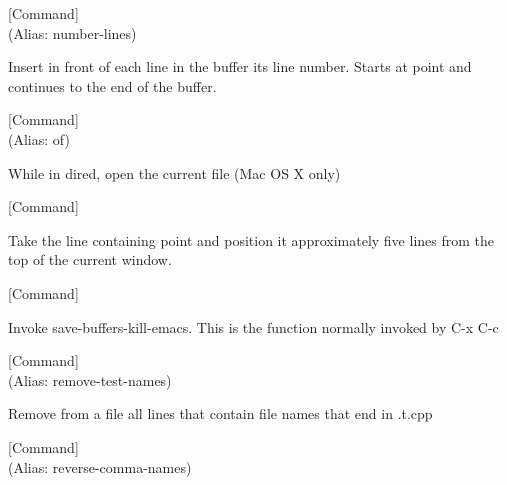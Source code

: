 \vspace{1em}
\noindent
{}
\usebox{\funcname}
 \hfill [Command]\\%
 (Alias: number-lines)

\begin{doc-string}
Insert in front of each line in the buffer its line number.  Starts
at point and continues to the end of the buffer.
\end{doc-string}

\vspace{1em}
\noindent
{}
\usebox{\funcname}
 \hfill [Command]\\%
 (Alias: of)

\begin{doc-string}
While in dired, open the current file (Mac OS X only)
\end{doc-string}

\vspace{1em}
\noindent
{}
\usebox{\funcname}
 \hfill [Command]

\begin{doc-string}
Take the line containing point and position it approximately five lines
from the top of the current window.
\end{doc-string}

\vspace{1em}
\noindent
{}
\usebox{\funcname}
 \hfill [Command]

\begin{doc-string}
Invoke save-buffers-kill-emacs.  This is the function normally
invoked by C-x C-c
\end{doc-string}

\vspace{1em}
\noindent
{}
\usebox{\funcname}
 \hfill [Command]\\%
 (Alias: remove-test-names)

\begin{doc-string}
Remove from a file all lines that contain file names that end in .t.cpp
\end{doc-string}

\vspace{1em}
\noindent
{}
\usebox{\funcname}
 \hfill [Command]\\%
 (Alias: reverse-comma-names)

